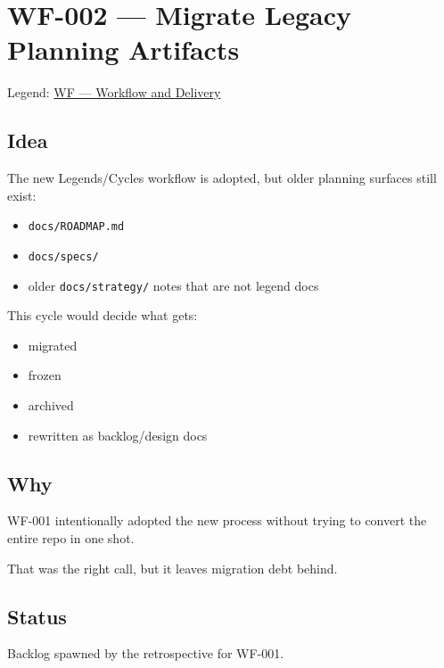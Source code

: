 \chapter{WF-002 --- Migrate Legacy Planning Artifacts}\label{record-404}

\smallskip

Legend: \href{https://github.com/flyingrobots/bijou/blob/cbd70612140e7a450d764b3c7be1c6af878b99bc/docs/method/graveyard/legends/WF-workflow-and-delivery.md}{WF --- Workflow and Delivery}

\section{Idea}\label{record-404-idea}

The new Legends/Cycles workflow is adopted, but older planning surfaces still exist:

\begin{itemize}
\tightlist
\item
  \texttt{d\allowbreak{}o\allowbreak{}c\allowbreak{}s\allowbreak{}/\allowbreak{}R\allowbreak{}O\allowbreak{}A\allowbreak{}D\allowbreak{}M\allowbreak{}A\allowbreak{}P\allowbreak{}.\allowbreak{}m\allowbreak{}d}
\item
  \texttt{d\allowbreak{}o\allowbreak{}c\allowbreak{}s\allowbreak{}/\allowbreak{}s\allowbreak{}p\allowbreak{}e\allowbreak{}c\allowbreak{}s\allowbreak{}/}
\item
  older \texttt{d\allowbreak{}o\allowbreak{}c\allowbreak{}s\allowbreak{}/\allowbreak{}s\allowbreak{}t\allowbreak{}r\allowbreak{}a\allowbreak{}t\allowbreak{}e\allowbreak{}g\allowbreak{}y\allowbreak{}/} notes that are not legend docs
\end{itemize}

This cycle would decide what gets:

\begin{itemize}
\tightlist
\item
  migrated
\item
  frozen
\item
  archived
\item
  rewritten as backlog/design docs
\end{itemize}

\section{Why}\label{record-404-why}

WF-001 intentionally adopted the new process without trying to convert the entire repo in one shot.

That was the right call, but it leaves migration debt behind.

\section{Status}\label{record-404-status}

Backlog spawned by the retrospective for WF-001.

